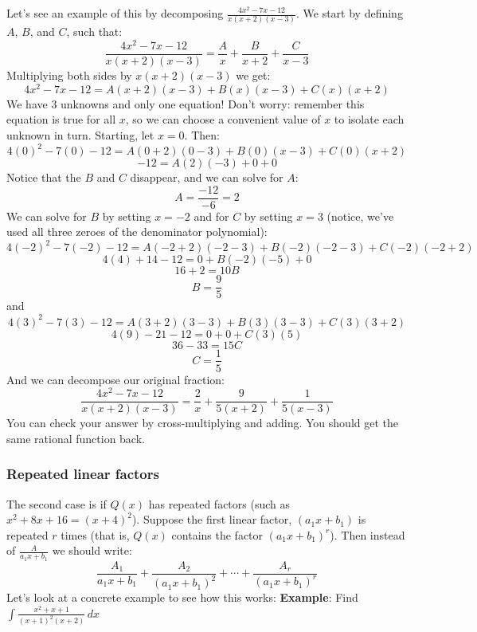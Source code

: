 Let's see an example of this by decomposing $\frac{4x^2 - 7x - 12}{x (x + 2) (x 
- 3)}$. We start by defining $A$, $B$, and $C$, such that:
$$\frac{4x^2 - 7x - 12}{x (x + 2) (x - 3)} = \frac{A}{x} + \frac{B}{x + 2} + 
\frac{C}{x - 3}$$
Multiplying both sides by $x (x + 2) (x - 3)$ we get:
$$4x^2 - 7x - 12 = A(x + 2)(x - 3) + B(x)(x - 3) + C(x)(x + 2)$$
We have 3 unknowns and only one equation! Don't worry: remember this equation 
is true for all $x$, so we can choose a convenient value of $x$ to isolate 
each unknown in turn. Starting, let $x = 0$. Then:
$$4(0)^2 - 7(0) - 12 = A(0 + 2)(0 - 3) + B(0)(x - 3) + C(0)(x + 2)$$
$$-12 = A(2)(-3) + 0 + 0$$
Notice that the $B$ and $C$ disappear, and we can solve for $A$:
$$A = \frac{-12}{-6} = 2$$
We can solve for $B$ by setting $x = -2$ and for $C$ by setting $x = 3$ 
(notice, we've used all three zeroes of the denominator polynomial):
$$4(-2)^2 - 7(-2) - 12 = A(-2 + 2)(-2 - 3) + B(-2)(-2 - 3) + C(-2)(-2 + 2)$$
$$4(4) + 14 - 12 = 0 + B(-2)(-5) + 0$$
$$16 + 2 = 10B$$
$$B = \frac{9}{5}$$
and
$$4(3)^2 - 7(3) - 12 = A(3 + 2)(3 - 3) + B(3)(3 - 3) + C(3)(3 + 2)$$
$$4(9) - 21 - 12 = 0 + 0 + C(3)(5)$$
$$36 - 33 = 15C$$
$$C = \frac{1}{5}$$
And we can decompose our original fraction:
$$\frac{4x^2 - 7x - 12}{x (x + 2) (x - 3)} = \frac{2}{x} + \frac{9}{5(x + 2)} 
+ \frac{1}{5(x - 3)}$$
You can check your answer by cross-multiplying and adding. You should get the 
same rational function back. 

\subsubsection{Repeated linear factors}
The second case is if $Q(x)$ has repeated factors (such as $x^2 + 8x + 16 = (x 
+ 4)^2$). Suppose the first linear factor, $(a_1x + b_1)$ is repeated $r$ 
times (that is, $Q(x)$ contains the factor $(a_1x + b_1)^r$). Then instead of 
$\frac{A}{a_1x + b_1}$ we should write:
$$\frac{A_1}{a_1x + b_1} + \frac{A_2}{(a_1x + b_1)^2} + \cdots + \frac{A_r}{(
a_1x + b_1)^r}$$
Let's look at a concrete example to see how this works:
\textbf{Example}: Find $\int \frac{x^2 + x + 1}{(x + 1)^2 (x + 2)}\,dx$

